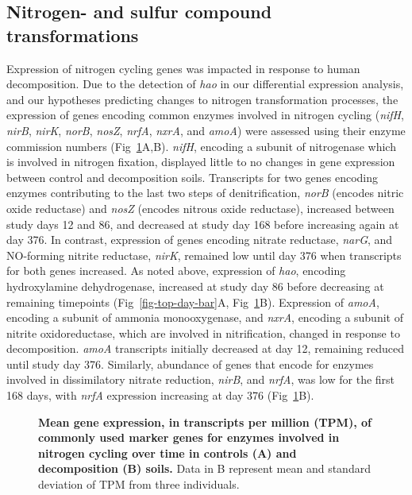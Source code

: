 \documentclass[
  sn-nature,
  lineno, referee]{sn-jnl}
\begin{document}
\subsection{Nitrogen- and sulfur compound
transformations}\label{nitrogen--and-sulfur-compound-transformations}

Expression of nitrogen cycling genes was impacted in response to human
decomposition. Due to the detection of \emph{hao} in our differential
expression analysis, and our hypotheses predicting changes to nitrogen
transformation processes, the expression of genes encoding common
enzymes involved in nitrogen cycling (\emph{nifH}, \emph{nirB},
\emph{nirK}, \emph{norB}, \emph{nosZ}, \emph{nrfA}, \emph{nxrA}, and
\emph{amoA}) were assessed using their enzyme commission numbers
(Fig~\ref{fig-n-genes}A,B). \emph{nifH}, encoding a subunit of
nitrogenase which is involved in nitrogen fixation, displayed little to
no changes in gene expression between control and decomposition soils.
Transcripts for two genes encoding enzymes contributing to the last two
steps of denitrification, \emph{norB} (encodes nitric oxide reductase)
and \emph{nosZ} (encodes nitrous oxide reductase), increased between
study days 12 and 86, and decreased at study day 168 before increasing
again at day 376. In contrast, expression of genes encoding nitrate
reductase, \emph{narG}, and NO-forming nitrite reductase, \emph{nirK},
remained low until day 376 when transcripts for both genes increased. As
noted above, expression of \emph{hao}, encoding hydroxylamine
dehydrogenase, increased at study day 86 before decreasing at remaining
timepoints (Fig~\ref{fig-top-day-bar}A, Fig~\ref{fig-n-genes}B).
Expression of \emph{amoA}, encoding a subunit of ammonia monooxygenase,
and \emph{nxrA}, encoding a subunit of nitrite oxidoreductase, which are
involved in nitrification, changed in response to decomposition.
\emph{amoA} transcripts initially decreased at day 12, remaining reduced
until study day 376. Similarly, abundance of genes that encode for
enzymes involved in dissimilatory nitrate reduction, \emph{nirB}, and
\emph{nrfA}, was low for the first 168 days, with \emph{nrfA} expression
increasing at day 376 (Fig~\ref{fig-n-genes}B).

\begin{figure}[!h]
\caption{{\bf Mean gene expression, in transcripts per million (TPM), of commonly used marker genes for enzymes involved in nitrogen cycling over time in controls (A) and decomposition (B) soils.}
Data in B represent mean and standard deviation of TPM from three individuals.}
\label{fig-n-genes}
\end{figure}
\end{document}
